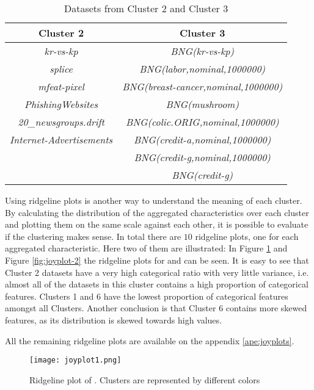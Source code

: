 \begin{table}[h!] 
    \centering
    \begin{tabular}{||c c||} 
     \hline
     Cluster 2 & Cluster 3 \\ [0.5ex] 
     \hline\hline
     \textit{kr-vs-kp} & \textit{BNG(kr-vs-kp)} \\
     \textit{splice} & \textit{BNG(labor,nominal,1000000)} \\
     \textit{mfeat-pixel} & \textit{BNG(breast-cancer,nominal,1000000)} \\
     \textit{PhishingWebsites} & \textit{BNG(mushroom)} \\
     \textit{20\_newsgroups.drift} & \textit{BNG(colic.ORIG,nominal,1000000)} \\
     \textit{Internet-Advertisements} & \textit{BNG(credit-a,nominal,1000000)} \\
     & \textit{BNG(credit-g,nominal,1000000)} \\
     & \textit{BNG(credit-g)} \\[1ex] 
     \hline
    \end{tabular}
    \caption{Datasets from Cluster 2 and Cluster 3}
    \label{table:1}
\end{table}

Using ridgeline plots is another way to understand the meaning of each cluster. By calculating the distribution of the aggregated characteristics over each cluster and plotting them on the same scale against each other, it is possible to evaluate if the clustering makes sense. In total there are $10$ ridgeline plots, one for each aggregated characteristic. Here two of them are illustrated: In Figure \ref{fig:joyplot-1} and Figure \ref{fig:joyplot-2} the ridgeline plots for  and  can be seen. It is easy to see that Cluster 2 datasets have a very high categorical ratio with very little variance, i.e. almost all of the datasets in this cluster contains a high proportion of categorical features. Clusters 1 and 6 have the lowest proportion of categorical features amongst all Clusters. Another conclusion is that Cluster 6 contains more skewed features, as its distribution is skewed towards high  values.

All the remaining ridgeline plots are available on the appendix \ref{ape:joyplots}.

\begin{figure}[H]
    \centering
    \texttt{[image: joyplot1.png]}
    \caption{Ridgeline plot of . Clusters are represented by different colors}
    \label{fig:joyplot-1}
\end{figure}

